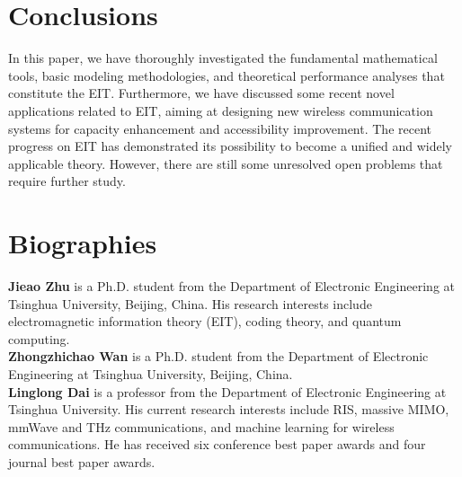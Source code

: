 \documentclass[journal,twocolumn]{IEEEtran}
\begin{document}
\section{Conclusions}
In this paper, we have thoroughly investigated the fundamental mathematical tools, basic modeling methodologies, and theoretical performance analyses that constitute the EIT. 
Furthermore, we have discussed some recent novel applications related to EIT, aiming at designing new wireless communication systems for capacity enhancement and accessibility improvement. 
The recent progress on EIT has demonstrated its possibility to become a unified and widely applicable theory. However, there are still some unresolved open problems that require further study. 


\footnotesize




\normalsize
\section*{Biographies}

{\bf Jieao Zhu} is a Ph.D. student from the Department of Electronic Engineering at Tsinghua University, Beijing, China. His research interests include electromagnetic information theory (EIT), coding theory, and quantum computing. 
\\

{\bf Zhongzhichao Wan} is a Ph.D. student from the Department of Electronic Engineering at Tsinghua University, Beijing, China.
\\


{\bf Linglong Dai} is a professor from the Department of Electronic Engineering at Tsinghua University. His current research interests include RIS, massive MIMO, mmWave and THz communications, and machine learning for wireless communications. He has received six conference best paper awards and four journal best paper awards.  
\end{document}
